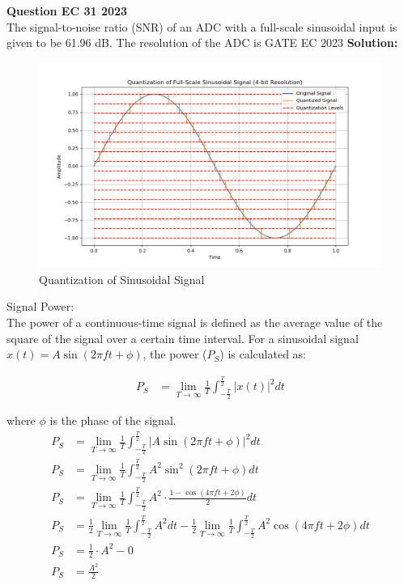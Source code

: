 \documentclass[journal,12pt,onecolumn]{IEEEtran}
\begin{document}
\vspace{3cm}
\title{}
\author{EE22BTECH11049 - Shivansh Kirar}
\maketitle
\textbf{Question EC 31 2023}\\
The signal-to-noise ratio (SNR) of an ADC with a full-scale sinusoidal input is given to be 61.96 dB. The resolution of the ADC is \hfill{GATE EC 2023}
\fi
\textbf{Solution:}
\begin{table}[H]

\label{table:Gate.31.2023.0}
\end{table}
\begin{figure}[H]
  \centering
  \includegraphics[width=1\textwidth]{2023/EC/31/Graph/a.png}
  \caption{Quantization of Sinusoidal Signal}
  \label{fig:Gate.31.2023.1}
\end{figure}
\enumerate
\item Signal Power: \\
The power of a continuous-time signal is defined as the average value of the square of the signal over a certain time interval. For a sinusoidal signal \(x(t) = A \sin(2\pi f t + \phi)\), the power (\(P_S\)) is calculated as:

\begin{align}
P_S &= \lim_{{T \to \infty}} \frac{1}{T} \int_{{-\frac{T}{2}}}^{{\frac{T}{2}}} |x(t)|^2 dt
\end{align}

where \(\phi\) is the phase of the signal.
\begin{align}
P_S &= \lim_{{T \to \infty}} \frac{1}{T} \int_{{-\frac{T}{2}}}^{{\frac{T}{2}}} |A \sin(2\pi f t + \phi)|^2 dt\\
P_S &= \lim_{{T \to \infty}} \frac{1}{T} \int_{{-\frac{T}{2}}}^{{\frac{T}{2}}} A^2 \sin^2(2\pi f t + \phi) dt\\
P_S &= \lim_{{T \to \infty}} \frac{1}{T} \int_{{-\frac{T}{2}}}^{{\frac{T}{2}}} A^2 \cdot \frac{1 - \cos(4\pi f t + 2\phi)}{2} dt\\
P_S &= \frac{1}{2} \lim_{{T \to \infty}} \frac{1}{T} \int_{{-\frac{T}{2}}}^{{\frac{T}{2}}} A^2 dt - \frac{1}{2} \lim_{{T \to \infty}} \frac{1}{T} \int_{{-\frac{T}{2}}}^{{\frac{T}{2}}} A^2 \cos(4\pi f t + 2\phi) dt\\
P_S &= \frac{1}{2} \cdot A^2 - 0\\
P_S &= \frac{A^2}{2}\\
\end{align}
\end{document}
